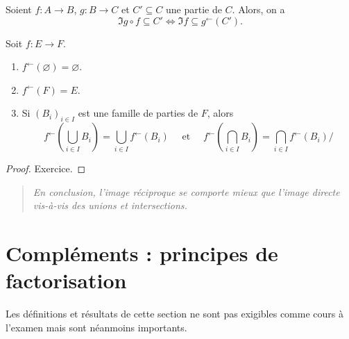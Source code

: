 \begin{exemple}
Soient $f : A\to B$,  $g : B\to C$ et $C'\subseteq C$ une partie de $C$. Alors, on a 
\[\Im g\circ f \subseteq C' \iff \Im f \subseteq g^\leftarrow(C').\]
\end{exemple}

\begin{proposition}
Soit $f : E\to F$.
\begin{enumerate}
\item $f^\leftarrow(\varnothing)=\varnothing$.
\item $f^\leftarrow(F)=E$.
\item Si $(B_i)_{i\in I}$ est une famille de parties de $F$, alors 
\[
f^\leftarrow\left(\bigcup_{i\in I}B_i\right) 
= \bigcup_{i\in I} f^\leftarrow(B_i)
\quad \text{ et } \quad 
f^\leftarrow\left(\bigcap_{i\in I}B_i\right) 
= \bigcap_{i\in I} f^\leftarrow(B_i)/
\]
\end{enumerate}
\end{proposition}
\begin{proof} Exercice.
\end{proof}

\begin{quote}
\emph{En conclusion, l'image réciproque se comporte mieux que l'image directe vis-à-vis des unions et intersections.}
\end{quote}



\section{Compléments : principes de factorisation}

Les définitions et résultats de cette section ne sont pas exigibles comme cours à l'examen mais sont néanmoins importants.

